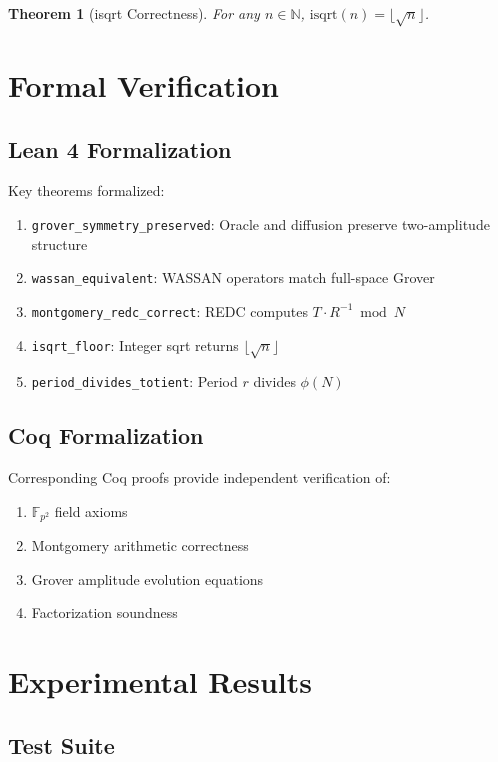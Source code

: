 \documentclass[11pt,a4paper]{article}
\newtheorem{theorem}{Theorem}
\begin{document}
\begin{theorem}[isqrt Correctness]
For any $n \in \mathbb{N}$, $\text{isqrt}(n) = \lfloor\sqrt{n}\rfloor$.
\end{theorem}

\section{Formal Verification}

\subsection{Lean 4 Formalization}

Key theorems formalized:
\begin{enumerate}
    \item \texttt{grover\_symmetry\_preserved}: Oracle and diffusion preserve two-amplitude structure
    \item \texttt{wassan\_equivalent}: WASSAN operators match full-space Grover
    \item \texttt{montgomery\_redc\_correct}: REDC computes $T \cdot R^{-1} \bmod N$
    \item \texttt{isqrt\_floor}: Integer sqrt returns $\lfloor\sqrt{n}\rfloor$
    \item \texttt{period\_divides\_totient}: Period $r$ divides $\phi(N)$
\end{enumerate}

\subsection{Coq Formalization}

Corresponding Coq proofs provide independent verification of:
\begin{enumerate}
    \item $\mathbb{F}_{p^2}$ field axioms
    \item Montgomery arithmetic correctness
    \item Grover amplitude evolution equations
    \item Factorization soundness
\end{enumerate}

\section{Experimental Results}

\subsection{Test Suite}
\end{document}
